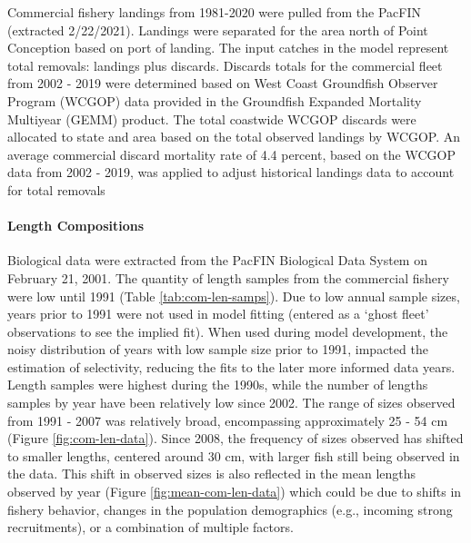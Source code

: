 \documentclass[11pt,
  english,
  a4paper,
]{article}
\begin{document}
\leavevmode\tagmcend\tagstructend\par


Commercial fishery landings from 1981-2020 were pulled from the PacFIN (extracted 2/22/2021). Landings were separated for the area north of Point Conception based on port of landing. The input catches in the model represent total removals: landings plus discards. Discards totals for the commercial fleet from 2002 - 2019 were determined based on West Coast Groundfish Observer Program (WCGOP) data provided in the Groundfish Expanded Mortality Multiyear (GEMM) product. The total coastwide WCGOP discards were allocated to state and area based on the total observed landings by WCGOP. An average commercial discard mortality rate of 4.4 percent, based on the WCGOP data from 2002 - 2019, was applied to adjust historical landings data to account for total removals

\leavevmode\tagmcend\tagstructend\par


\hypertarget{length-compositions}{%
\paragraph{Length Compositions}\label{length-compositions}}

\leavevmode\tagmcend\tagstructend


Biological data were extracted from the PacFIN Biological Data System on February 21, 2001. The quantity of length samples from the commercial fishery were low until 1991 (Table \ref{tab:com-len-samps}). Due to low annual sample sizes, years prior to 1991 were not used in model fitting (entered as a `ghost fleet' observations to see the implied fit). When used during model development, the noisy distribution of years with low sample size prior to 1991, impacted the estimation of selectivity, reducing the fits to the later more informed data years. Length samples were highest during the 1990s, while the number of lengths samples by year have been relatively low since 2002. The range of sizes observed from 1991 - 2007 was relatively broad, encompassing approximately 25 - 54 cm (Figure \ref{fig:com-len-data}). Since 2008, the frequency of sizes observed has shifted to smaller lengths, centered around 30 cm, with larger fish still being observed in the data. This shift in observed sizes is also reflected in the mean lengths observed by year (Figure \ref{fig:mean-com-len-data}) which could be due to shifts in fishery behavior, changes in the population demographics (e.g., incoming strong recruitments), or a combination of multiple factors.
\end{document}
